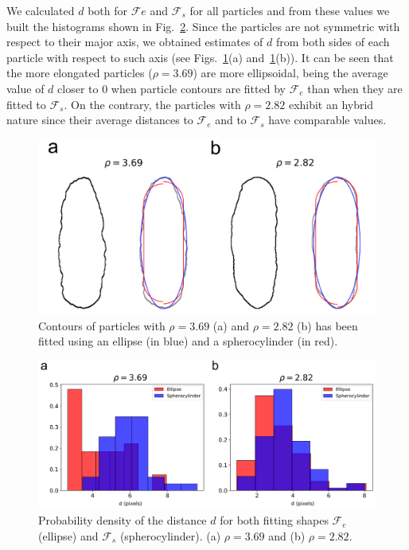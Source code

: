 \documentclass[aip,graphicx]{revtex4-1} %
\begin{document}
We calculated $d$ both for $\mathcal{F}e$ and $\mathcal{F}_s$ for all particles and from these values we built the histograms 
shown in Fig.~\ref{fig:Mean_dist}.
Since the particles are not symmetric with respect to their major axis, we obtained estimates of $d$ from both
sides of each particle with respect to such axis (see Figs.~\ref{fig:Part_fit}(a) and~\ref{fig:Part_fit}(b)).
It can be seen that the more elongated particles ($\rho = 3.69$) are more ellipsoidal, being the average value of $d$ closer
to $0$ when particle contours are fitted by $\mathcal{F}_e$ than when they are fitted to $\mathcal{F}_s$. 
On the contrary, the particles with $\rho = 2.82$ exhibit an hybrid nature since their average distances to $\mathcal{F}_e$ and 
to $\mathcal{F}_s$ have comparable values. 


\begin{figure}
    \centering
    \includegraphics[width=0.95\columnwidth]{Part fit.png}
    \caption{Contours of particles with $\rho = 3.69$ (a) and $\rho = 2.82$ (b) has been fitted using an ellipse (in blue) and a 
    spherocylinder (in red).}\label{fig:Part_fit}
\end{figure}

\begin{figure}
    \centering
    \includegraphics[width=0.95\columnwidth]{Mean_dist.png}
    \caption{Probability density of the distance $d$ for both fitting shapes $\mathcal{F}_e$ (ellipse) and $\mathcal{F}_s$ 
      (spherocylinder). (a) $\rho = 3.69$ and (b) $\rho = 2.82$.}\label{fig:Mean_dist}
\end{figure}
\end{document}
